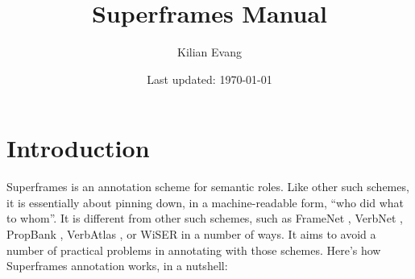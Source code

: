 \documentclass[a4paper]{article}
\title{Superframes Manual}
\author{Kilian Evang}
\date{Last updated: \today}
\begin{document}
\setlength{\Exindent}{0pt}
\setlength{\Exlabelsep}{0pt}
\setlength{\SubExleftmargin}{0pt}
\setlength{\SubSubExleftmargin}{0pt}

\maketitle


\tableofcontents

\section{Introduction}

Superframes is an annotation scheme for semantic roles. Like other such
schemes, it is essentially about pinning down, in a machine-readable form,
``who did what to whom''. It is different from other such schemes, such as
FrameNet \citep{baker-etal-1998-berkeley}, VerbNet
\citep{kipper-schuler-2005-verbnet}, PropBank
\citep{palmer-etal-2005-proposition}, VerbAtlas
\citep{di-fabio-etal-2019-verbatlas}, or WiSER \citep{feng-etal-2022-widely} in
a number of ways. It aims to avoid a number of practical problems in annotating
with those schemes. Here's how Superframes annotation works, in a nutshell:
\end{document}
